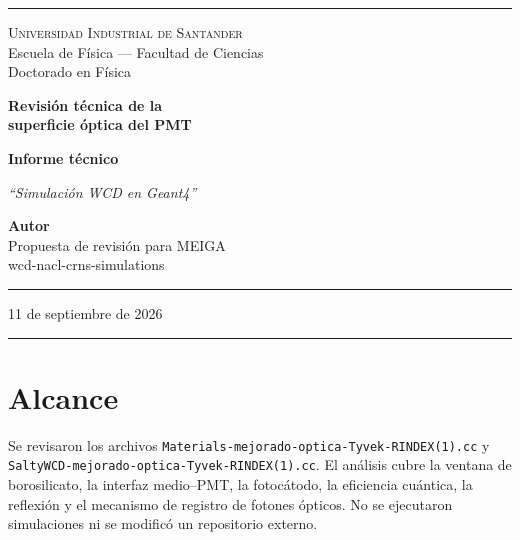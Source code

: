 \documentclass[11pt,a4paper]{article}
\begin{document}
\pagestyle{empty}


\begin{titlepage}
\begin{center}

\vspace*{0.5cm}
\textcolor{reglaColor}{\rule{\linewidth}{1.2pt}}

\vspace{1.3cm}
{\Large\scshape Universidad Industrial de Santander}\\[0.2cm]
{\large Escuela de Física --- Facultad de Ciencias}\\[0.2cm]
{\large Doctorado en Física}

\vspace{2.2cm}
{\Huge\bfseries\color{tituloColor} Revisión técnica de la\\[0.2cm]
superficie óptica del PMT}

\vspace{1.8cm}
{\large\textbf{Informe técnico}}

\vspace{0.6cm}
\begin{minipage}{0.82\linewidth}
\centering
\textit{``Simulación WCD en Geant4''}
\end{minipage}

\vfill

{\large\textbf{Autor}}\\[0.15cm]
Propuesta de revisión para MEIGA\\[0.1cm]
wcd-nacl-crns-simulations

\vspace{1.2cm}
\textcolor{reglaColor}{\rule{0.5\linewidth}{0.6pt}}

\vspace{1cm}
11 de septiembre de 2026

\vspace{1cm}
\textcolor{reglaColor}{\rule{\linewidth}{1.2pt}}

\end{center}
\end{titlepage}

\pagestyle{plain}

\section{Alcance}
Se revisaron los archivos \texttt{Materials-mejorado-optica-Tyvek-RINDEX(1).cc}
y \texttt{SaltyWCD-mejorado-optica-Tyvek-RINDEX(1).cc}. El análisis cubre la
ventana de borosilicato, la interfaz medio--PMT, la fotocátodo, la eficiencia
cuántica, la reflexión y el mecanismo de registro de fotones ópticos. No se
ejecutaron simulaciones ni se modificó un repositorio externo.
\end{document}
